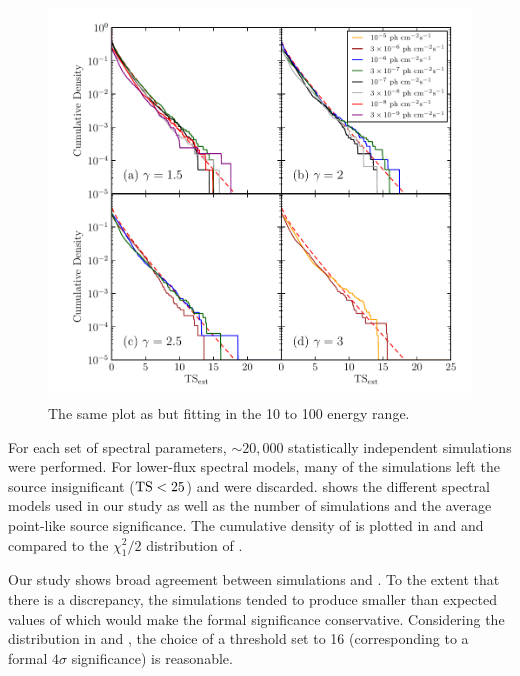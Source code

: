 \begin{figure}[htbp]
    \includegraphics{chapters/extended_analysis/figures/mc_plots/ts_ext_emin_10000_color.pdf}
    \caption{The same plot as  but fitting in
    the 10 \gev to 100 \gev energy range.}
  \end{figure}



For each set of spectral parameters, $\sim20,000$ statistically
independent simulations were performed. For lower-flux spectral models,
many of the simulations left the source insignificant ($\mathrm{TS}<25$) and
were discarded.   shows the different spectral
models used in our study as well as the number of simulations and the
average point-like source significance.  The cumulative density of \tsext
is plotted in  and  and
compared to the $\chi^2_1/2$ distribution of .

Our study shows broad agreement between simulations and
. To the extent that there is a discrepancy,
the simulations tended to produce smaller than expected values of \tsext
which would make the formal significance conservative.  Considering the
distribution in  and ,
the choice of a threshold \tsext set to 16 (corresponding to a formal
$4\sigma$ significance) is reasonable.

